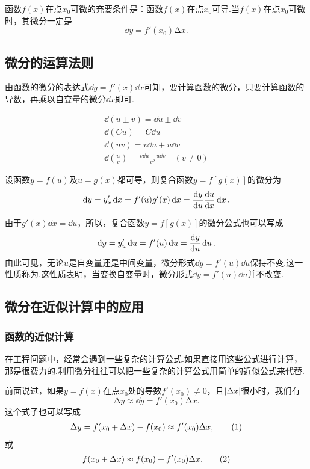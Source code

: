 \begin{theorem}
函数\(f(x)\)在点\(x_0\)可微的充要条件是：函数\(f(x)\)在点\(x_0\)可导.当\(f(x)\)在点\(x_0\)可微时，其微分一定是\[
\dd{y}=f'(x_0)\increment x.
\]
\end{theorem}

\subsection{微分的运算法则}
由函数的微分的表达式\(\dd{y} = f'(x) \dd{x}\)可知，要计算函数的微分，只要计算函数的导数，再乘以自变量的微分\(\dd{x}\)即可.

\begin{theorem}
\begin{gather*}
\dd(u \pm v) = \dd{u}\pm\dd{v} \\
\dd(C u) = C \dd{u} \\
\dd(u v) = v \dd{u} + u \dd{v} \\
\dd(\frac{u}{v}) = \frac{v \dd{u} - u \dd{v}}{v^2} \quad (v \neq 0)
\end{gather*}
\end{theorem}

\begin{theorem}[复合函数的微分法则]
设函数\(y=f(u)\)及\(u=g(x)\)都可导，则复合函数\(y=f[g(x)]\)的微分为\[
\dd{y}=y'_x\dd{x}=f'(u)g'(x)\dd{x}=\dv{y}{u}\dv{u}{x}\dd{x}.
\]

由于\(g'(x)\dd{x}=\dd{u}\)，所以，复合函数\(y=f[g(x)]\)的微分公式也可以写成\[
\dd{y}=y'_u\dd{u}=f'(u)\dd{u}=\dv{y}{u}\dd{u}.
\]由此可见，无论\(u\)是自变量还是中间变量，微分形式\(\dd{y}=f'(u)\dd{u}\)保持不变.这一性质称为.这性质表明，当变换自变量时，微分形式\(\dd{y}=f'(u)\dd{u}\)并不改变.
\end{theorem}

\subsection{微分在近似计算中的应用}
\subsubsection{函数的近似计算}
在工程问题中，经常会遇到一些复杂的计算公式.如果直接用这些公式进行计算，那是很费力的.利用微分往往可以把一些复杂的计算公式用简单的近似公式来代替.

前面说过，如果\(y=f(x)\)在点\(x_0\)处的导数\(f'(x_0)\neq0\)，且\(\abs{\Delta x}\)很小时，我们有\[
\increment y \approx\dd{y} = f'(x_0) \increment x.
\]这个式子也可以写成\begin{gather}
\increment y = f(x_0 + \increment x) - f(x_0) \approx f'(x_0) \increment x, \tag1
\end{gather}或\begin{gather}
f(x_0 + \increment x) \approx f(x_0) + f'(x_0) \increment x. \tag2
\end{gather}

